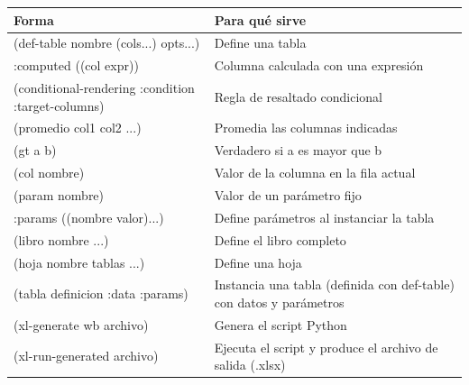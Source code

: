 \documentclass[12pt,a4paper]{report}
\begin{document}
\begin{center}
\begin{tabular}{>{\ttfamily}p{5cm}p{8cm}}
\toprule
\textbf{Forma} & \textbf{Para qué sirve} \\
\midrule
(def-table nombre (cols...) opts...) & Define una tabla \\
:computed ((col expr)) & Columna calculada con una expresión \\
(conditional-rendering :condition :target-columns) & Regla de resaltado condicional \\
(promedio col1 col2 ...) & Promedia las columnas indicadas \\
(gt a b) & Verdadero si a es mayor que b \\
(col nombre) & Valor de la columna en la fila actual \\
(param nombre) & Valor de un parámetro fijo \\
:params ((nombre valor)...) & Define parámetros al instanciar la tabla \\
(libro nombre ...) & Define el libro completo \\
(hoja nombre tablas ...) & Define una hoja \\
(tabla definicion :data :params) & Instancia una tabla (definida con def-table) con datos y parámetros \\
(xl-generate wb archivo) & Genera el script Python \\
(xl-run-generated archivo) & Ejecuta el script y produce el archivo de salida (.xlsx) \\
\bottomrule
\end{tabular}
\end{center}
\end{document}
